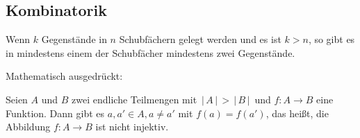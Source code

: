 \documentclass[a4paper,12pt]{article}
\begin{document}
\subsection{Kombinatorik}
\begin{center}
        \glqq Wenn $k$ Gegenstände in $n$ Schubfächern gelegt werden und es ist $k>n$, so gibt es in mindestens einem der Schubfächer mindestens zwei Gegenstände.\grqq
\end{center}
Mathematisch ausgedrückt:
\begin{center}
        Seien $A$ und $B$ zwei endliche Teilmengen mit $\,|\, A\,|\, >\,|\, B\,|\, $ und $f:A\rightarrow B$ eine Funktion. Dann gibt es $a,a' \in A,a\neq a'$ mit $f\left( a\right) =f\left( a'\right) $, das heißt, die Abbildung $f:A\rightarrow B$ ist nicht injektiv.
\end{center}
\end{document}
